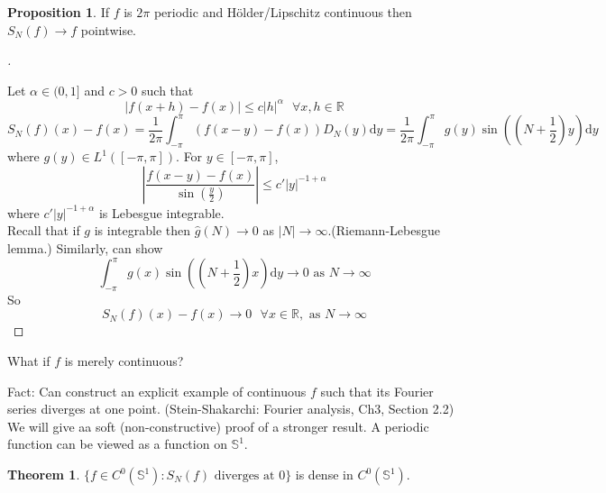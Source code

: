 \documentclass{article}
\newcommand{\sfa}{\text{  } \forall}
\theoremstyle{definition}
\newtheorem{thm}{Theorem}
\newtheorem{prop}{Proposition}
\newenvironment{proofs}[1][\proofname]{%
  \begin{proof}[#1]$ $\par\nobreak\ignorespaces
}{%
  \end{proof}
}
\begin{document}
\begin{prop}
	If $f$ is $2 \pi$ periodic and H\"older/Lipschitz continuous then $S_N(f) \to f$ pointwise.
\end{prop}

\begin{proofs}
	Let $\alpha \in (0, 1]$ and $c > 0$ such that
	\[
		|f(x + h) - f(x)| \leq c |h|^\alpha \sfa x, h \in \mathbb{R}
	\]
	\[
		S_N(f)(x) - f(x) = \frac{1}{2 \pi} \int_{- \pi}^\pi \left(f(x - y) - f(x)\right) D_N(y) \mathrm{d} y = \frac{1}{2 \pi} \int_{- \pi}^\pi g(y) \sin \left( \left(N + \frac{1}{2} \right) y \right) \mathrm{d} y
	\]
	where $g(y) \in L^1([-\pi, \pi])$.
	For $y \in [-\pi, \pi]$, 
	\[
		\left|\frac{f(x - y) - f(x)}{\sin \left( \frac{y}{2} \right) } \right| \leq c'|y|^{-1 + \alpha}
	\]
	where $c'|y|^{-1 + \alpha}$ is Lebesgue integrable.\\
	Recall that if $g$ is integrable then $\hat{g}(N) \to 0$ as $|N| \to \infty$.(Riemann-Lebesgue lemma.)
	Similarly, can show
	\[
		\int_{-\pi}^\pi g(x) \sin \left( \left( N + \frac{1}{2} \right) x \right) \mathrm{d} y \to 0 \text{ as } N \to \infty
	\]
	So 
	\[
		S_N(f)(x) - f(x) \to 0 \sfa x \in \mathbb{R}, \text{ as } N \to \infty
	\]
\end{proofs}

What if $f$ is merely continuous?
\par Fact: Can construct an explicit example of continuous $f$ such that its Fourier series diverges at one point.
(Stein-Shakarchi: Fourier analysis, Ch3, Section 2.2)
We will give aa soft (non-constructive) proof of a stronger result.
A periodic function can be viewed as a function on $\mathbb{S}^1$.

\begin{thm}
	$\{f \in C^0(\mathbb{S}^1): S_N(f) \text{ diverges at } 0 \}$ is dense in $C^0(\mathbb{S}^1)$.
\end{thm}
\end{document}
